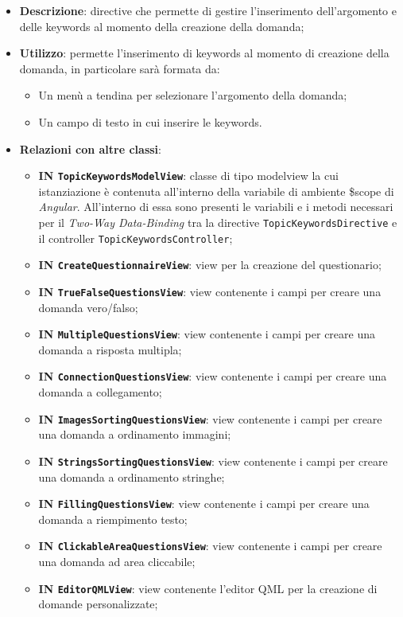 \begin{itemize}
	\item \textbf{Descrizione}: directive che permette di gestire l'inserimento dell'argomento e delle keywords al momento della creazione della domanda;
	\item \textbf{Utilizzo}: permette l'inserimento di keywords al momento di creazione della domanda, in particolare sarà formata da:
	\begin{itemize}
		\item Un menù a tendina per selezionare l'argomento della domanda;
		\item Un campo di testo in cui inserire le keywords.
	\end{itemize}
	\item \textbf{Relazioni con altre classi}:
	\begin{itemize}
		\item \textbf{IN \texttt{TopicKeywordsModelView}}: classe di tipo modelview la cui istanziazione è contenuta all'interno della variabile di ambiente \$scope di \textit{Angular}. All'interno di essa sono presenti le variabili e i metodi necessari per il \textit{Two-Way Data-Binding} tra la directive \texttt{TopicKeywordsDirective} e il controller \texttt{TopicKeywordsController};
		\item \textbf{IN \texttt{CreateQuestionnaireView}}: view per la creazione del questionario; 
		\item \textbf{IN \texttt{TrueFalseQuestionsView}}: view contenente i campi per creare una domanda vero/falso; 
		\item \textbf{IN \texttt{MultipleQuestionsView}}: view contenente i campi per creare una domanda a risposta multipla;
		\item \textbf{IN \texttt{ConnectionQuestionsView}}: view contenente i campi per creare una domanda a collegamento;
		\item \textbf{IN \texttt{ImagesSortingQuestionsView}}: view contenente i campi per creare una domanda a ordinamento immagini;
		\item \textbf{IN \texttt{StringsSortingQuestionsView}}: view contenente i campi per creare una domanda a ordinamento stringhe;
		\item \textbf{IN \texttt{FillingQuestionsView}}: view contenente i campi per creare una domanda a riempimento testo;
		\item \textbf{IN \texttt{ClickableAreaQuestionsView}}: view contenente i campi per creare una domanda ad area cliccabile;
		\item \textbf{IN \texttt{EditorQMLView}}: view contenente l'editor QML per la creazione di domande personalizzate;

\end{itemize}
\end{itemize}
